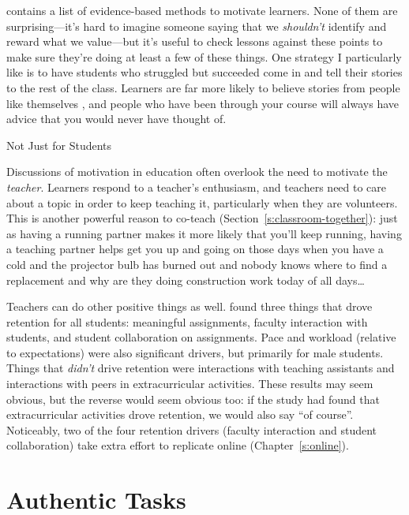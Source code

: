 \cite{Ambr2010} contains a list of evidence-based methods to motivate
learners. None of them are surprising---it's hard to imagine someone
saying that we \emph{shouldn't} identify and reward what we value---but it's
useful to check lessons against these points to make sure they're doing
at least a few of these things. One strategy I particularly like is to
have students who struggled but succeeded come in and tell their stories
to the rest of the class. Learners are far more likely to believe
stories from people like themselves \cite{Mill2016a}, and people who
have been through your course will always have advice that you would
never have thought of.

\begin{aside}{Not Just for Students}

Discussions of motivation in education often overlook the need to
motivate the \emph{teacher}. Learners respond to a teacher's enthusiasm,
and teachers need to care about a topic in order to keep teaching it,
particularly when they are volunteers. This is another powerful reason
to co-teach (Section~\ref{s:classroom-together}): just as having a
running partner makes it more likely that you'll keep running, having
a teaching partner helps get you up and going on those days when you
have a cold and the projector bulb has burned out and nobody knows
where to find a replacement and why are they doing construction work
today of all days\ldots{}

\end{aside}

Teachers can do other positive things as well. \cite{Bark2014} found
three things that drove retention for all students: meaningful
assignments, faculty interaction with students, and student
collaboration on assignments. Pace and workload (relative to
expectations) were also significant drivers, but primarily for male
students. Things that \emph{didn't} drive retention were interactions with
teaching assistants and interactions with peers in extracurricular
activities. These results may seem obvious, but the reverse would seem
obvious too: if the study had found that extracurricular activities
drove retention, we would also say ``of course''. Noticeably, two of the
four retention drivers (faculty interaction and student collaboration)
take extra effort to replicate online (Chapter~\ref{s:online}).

\section{Authentic Tasks}\label{s:motivation-authentic}

